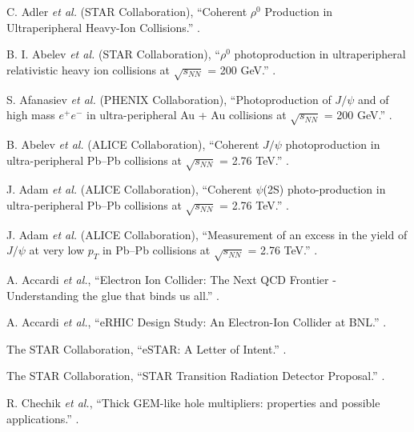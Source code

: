 \begin{thebibliography}{10}
C. Adler {\it et al.} (STAR Collaboration),
\newblock ``Coherent $\rho^{0}$ Production in Ultraperipheral Heavy-Ion Collisions.''
.

B. I. Abelev {\it et al.} (STAR Collaboration),
\newblock ``$\rho^{0}$ photoproduction in ultraperipheral relativistic heavy ion collisions at $\sqrt{s_{NN}}$ = 200 GeV.''
.

S. Afanasiev {\it et al.} (PHENIX Collaboration),
\newblock ``Photoproduction of $J/\psi$ and of high mass $e^{+}e^{-}$ in ultra-peripheral Au + Au collisions at $\sqrt{s_{NN}}$ = 200 GeV.''
.

B. Abelev {\it et al.} (ALICE Collaboration),
\newblock ``Coherent $J/\psi$ photoproduction in ultra-peripheral Pb–Pb collisions
at $\sqrt{s_{NN}}$ = 2.76 TeV.''
.

J. Adam {\it et al.} (ALICE Collaboration),
\newblock ``Coherent  $\psi$(2S) photo-production in ultra-peripheral Pb–Pb collisions 
at $\sqrt{s_{NN}}$ = 2.76 TeV.''
.

J. Adam {\it et al.} (ALICE Collaboration),
\newblock ``Measurement of an excess in the yield of $J/\psi$ at very low $p_{T}$ in Pb–Pb collisions at $\sqrt{s_{NN}}$ = 2.76 TeV.''
.

 A. Accardi {\it et al.},
\newblock ``Electron Ion Collider: The Next QCD Frontier - Understanding the glue that binds us all.''
.

 A. Accardi {\it et al.},
\newblock ``eRHIC Design Study: An Electron-Ion Collider at BNL.''
.

The STAR Collaboration,
\newblock ``eSTAR: A Letter of Intent.''
.

The STAR Collaboration,
\newblock ``STAR Transition Radiation Detector Proposal.''
.

R. Chechik {\it et al.},
\newblock ``Thick GEM-like hole multipliers: properties and possible applications.''
.


\end{thebibliography}
